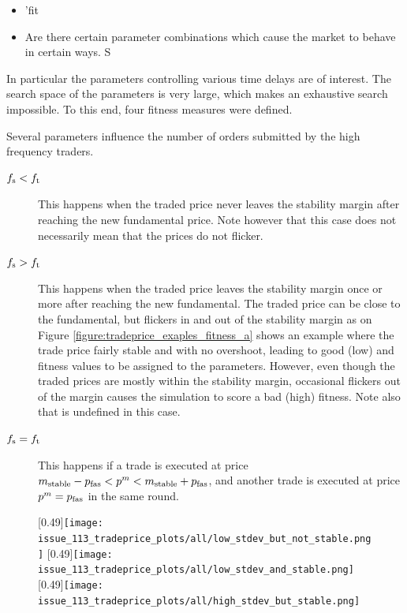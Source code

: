 \begin{itemize}
\item 'fit
\item Are there certain parameter combinations which cause the market to behave in certain ways. S
\end{itemize}
In particular the parameters controlling various time delays are of interest. 
The search space of the parameters is very large, which makes an exhaustive search impossible.
To this end, four fitness measures were defined.

Several parameters influence the number of orders submitted by the high frequency traders.

\begin{description}
\item[$f_\text{s} < f_\text{t}$] This happens when the traded price never leaves the stability margin after reaching the new fundamental price. Note however that this case does not necessarily mean that the prices do not flicker. 
\item[$f_\text{s} > f_\text{t}$] This happens when the traded price leaves the stability margin once or more after reaching the new fundamental. The traded price can be close to the fundamental, but flickers in and out of the stability margin as on Figure \ref{figure:tradeprice_exaples_fitness_a} shows an example where the trade price fairly stable and with no overshoot, leading to good (low) \stdev and \overshoot fitness values to be assigned to the parameters. However, even though the traded prices are mostly within the stability margin, occasional flickers out of the margin causes the simulation to score a bad (high) \roundstable fitness. Note also that \timetoreachnewfundamental is undefined in this case. 
\item[$f_\text{s} = f_\text{t}$] This happens if a trade is executed at price $m_\text{stable} - p_\text{fas} < p^m < m_\text{stable} + p_\text{fas}$, and another trade is executed at price $p^m = p_\text{fas}$ in the same round. 
\end{description}

\begin{figure}
\centering
\subcaptionbox{\label{figure:tradeprice_exaples_fitness_a}}
[0.49\linewidth]{\texttt{[image: issue\_113\_tradeprice\_plots/all/low\_stdev\_but\_not\_stable.png]}}
\subcaptionbox{\label{figure:tradeprice_exaples_fitness_b}}
[0.49\linewidth]{\texttt{[image: issue\_113\_tradeprice\_plots/all/low\_stdev\_and\_stable.png]}}
\subcaptionbox{\label{figure:tradeprice_exaples_fitness_c}}
[0.49\linewidth]{\texttt{[image: issue\_113\_tradeprice\_plots/all/high\_stdev\_but\_stable.png]}}
\label{figure:tradeprice_exaples_fitness}
\end{figure}

